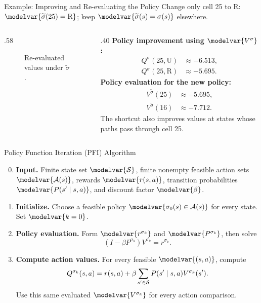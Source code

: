 \begin{frame}{Example: Improving and Re-evaluating the Policy}
\small
Change only cell 25 to R: \(\modelvar{\widetilde\sigma(25)=\mathrm R}\); keep \(\modelvar{\widetilde\sigma(s)=\sigma(s)}\) elsewhere.
\begin{columns}[c]
\begin{column}{.58\textwidth}
\begin{figure}\centering
{}\MazeLegend
\caption{Re-evaluated values under \(\widetilde\sigma\).}
\end{figure}
\end{column}
\begin{column}{.40\textwidth}
\textbf{Policy improvement using \(\modelvar{V^\sigma}\):}
\[
\begin{aligned}
Q^\sigma(25,\mathrm U)&\approx-6.513,\\
Q^\sigma(25,\mathrm R)&\approx-5.695.
\end{aligned}
\]
\textbf{Policy evaluation for the new policy:}
\[
\begin{aligned}
V^{\widetilde\sigma}(25)&\approx-5.695,\\
V^{\widetilde\sigma}(16)&\approx-7.712.
\end{aligned}
\]
The shortcut also improves values at states whose paths pass through cell 25.
\end{column}
\end{columns}
\end{frame}

\begin{frame}{Policy Function Iteration (PFI) Algorithm}
\small
\begin{enumerate}
\setcounter{enumi}{-1}
\item \textbf{Input.} Finite state set \(\modelvar{\Sset}\), finite nonempty feasible action sets \(\modelvar{\Aset(s)}\), rewards \(\modelvar{r(s,a)}\), transition probabilities \(\modelvar{P(s'\mid s,a)}\), and discount factor \(\modelvar{\beta}\).
\item \textbf{Initialize.} Choose a feasible policy \(\modelvar{\sigma_0(s)\in\Aset(s)}\) for every state. Set \(\modelvar{k=0}\).
\item \textbf{Policy evaluation.} Form \(\modelvar{r^{\sigma_k}}\) and \(\modelvar{P^{\sigma_k}}\), then solve
\[(I-\beta P^{\sigma_k})V^{\sigma_k}=r^{\sigma_k}.\]
\item \textbf{Compute action values.} For every feasible \(\modelvar{(s,a)}\), compute
\[Q^{\sigma_k}(s,a)=r(s,a)+\beta\sum_{s'\in\mathcal S}P(s'\mid s,a)V^{\sigma_k}(s').\]
Use this same evaluated \(\modelvar{V^{\sigma_k}}\) for every action comparison.
\end{enumerate}
\end{frame}

